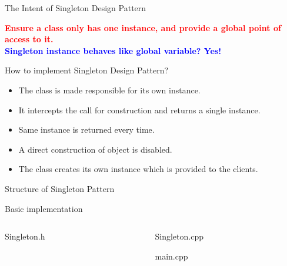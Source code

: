 \documentclass[13pt]{beamer}
\begin{document}
\begin{frame}{The Intent of Singleton Design Pattern}
	\begin{center}
	\textcolor{red}{\textbf{Ensure a class only has one instance, and provide a global point of access to it.}}\\
	\textcolor{blue}{\textbf{Singleton instance behaves like global variable? Yes!}}
	\end{center}
\end{frame}

\begin{frame}{How to implement Singleton Design Pattern?}
	\begin{itemize}
		\setlength\itemsep{2em}
		\item The class is made responsible for its own instance.
		\item It intercepts the call for construction and returns a single instance.
		\item Same instance is returned every time.
		\item A direct construction of object is disabled.
		\item The class creates its own instance which is provided to the clients.
	\end{itemize}
\end{frame}

\begin{frame}{Structure of Singleton Pattern}
	\begin{center}
	\end{center}
\end{frame}

\begin{frame}{Basic implementation}
\begin{columns}[T]
\begin{column}{.48\textwidth}
\lstset{basicstyle=\tiny,style=myCustomCppStyle}
Singleton.h

\end{column}

\begin{column}{.48\textwidth}
\lstset{basicstyle=\tiny,style=myCustomCppStyle}
Singleton.cpp

main.cpp

\end{column}
\end{columns}
\end{frame}
\end{document}
